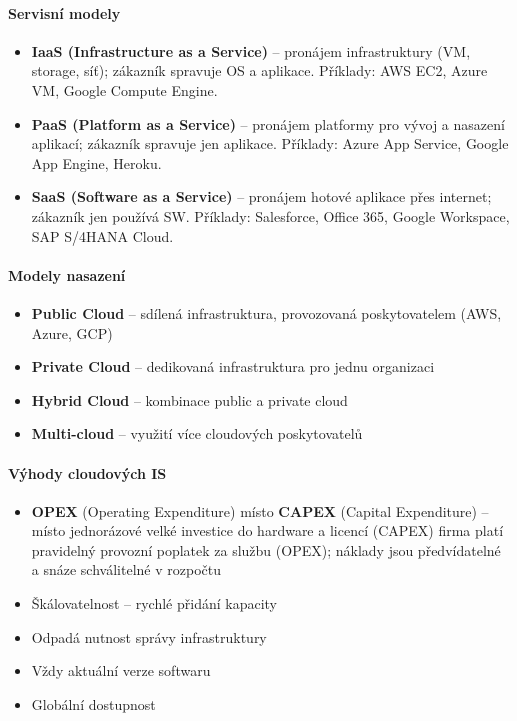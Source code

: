 \paragraph{Servisní modely}
\begin{itemize}
  \item \textbf{IaaS (Infrastructure as a Service)} -- pronájem infrastruktury (VM, storage, síť);
    zákazník spravuje OS a aplikace. Příklady: AWS EC2, Azure VM, Google Compute Engine.
  \item \textbf{PaaS (Platform as a Service)} -- pronájem platformy pro vývoj a nasazení aplikací;
    zákazník spravuje jen aplikace. Příklady: Azure App Service, Google App Engine, Heroku.
  \item \textbf{SaaS (Software as a Service)} -- pronájem hotové aplikace přes internet;
    zákazník jen používá SW. Příklady: Salesforce, Office 365, Google Workspace, SAP S/4HANA Cloud.
\end{itemize}

\paragraph{Modely nasazení}
\begin{itemize}
  \item \textbf{Public Cloud} -- sdílená infrastruktura, provozovaná poskytovatelem (AWS, Azure, GCP)
  \item \textbf{Private Cloud} -- dedikovaná infrastruktura pro jednu organizaci
  \item \textbf{Hybrid Cloud} -- kombinace public a private cloud
  \item \textbf{Multi-cloud} -- využití více cloudových poskytovatelů
\end{itemize}

\paragraph{Výhody cloudových IS}
\begin{itemize}
  \item \textbf{OPEX} (Operating Expenditure) místo \textbf{CAPEX} (Capital Expenditure) --
    místo jednorázové velké investice do hardware a licencí (CAPEX) firma platí pravidelný
    provozní poplatek za službu (OPEX); náklady jsou předvídatelné a snáze schválitelné v rozpočtu
  \item Škálovatelnost -- rychlé přidání kapacity
  \item Odpadá nutnost správy infrastruktury
  \item Vždy aktuální verze softwaru
  \item Globální dostupnost
\end{itemize}

